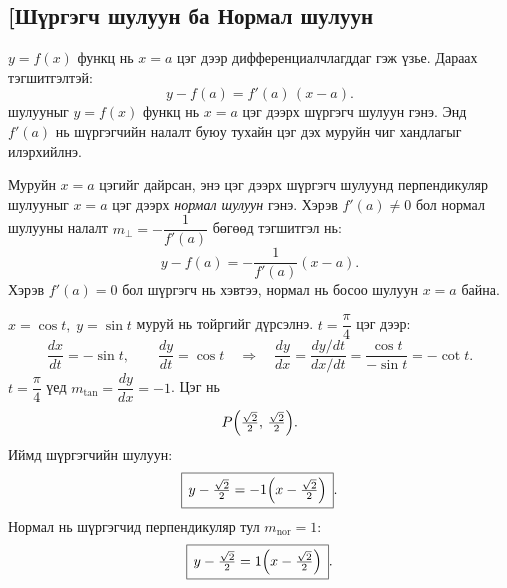 \subsection{[Шүргэгч шулуун ба Нормал шулуун}
\begin{definition}
$y=f(x)$ функц нь $x=a$ цэг дээр дифференциалчлагддаг гэж үзье.  
Дараах тэгшитгэлтэй:
\[
\boxed{y - f(a) = f'(a)\,(x - a).}
\] шулууныг $y=f(x)$ функц нь $x=a$ цэг дээрх шүргэгч шулуун гэнэ.
Энд $f'(a)$ нь шүргэгчийн налалт буюу тухайн цэг дэх муруйн чиг хандлагыг илэрхийлнэ.
\end{definition}
\begin{definition}
Муруйн $x=a$ цэгийг дайрсан, энэ цэг дээрх  шүргэгч шулуунд перпендикуляр шулууныг $x=a$ цэг дээрх \emph{нормал шулуун} гэнэ.  
Хэрэв $f'(a)\ne 0$ бол нормал шулууны налалт $m_\perp=-\dfrac{1}{f'(a)}$ бөгөөд тэгшитгэл нь:
\[
\boxed{y - f(a) = -\frac{1}{f'(a)}(x - a).}
\]
Хэрэв $f'(a)=0$ бол шүргэгч нь хэвтээ, нормал нь босоо шулуун $x=a$ байна.
\end{definition}

\begin{example}
 $x=\cos t,\; y=\sin t$ муруй нь тойргийг дүрсэлнэ. $t=\dfrac{\pi}{4}$ цэг дээр:
\[
\frac{dx}{dt}=-\sin t,\qquad \frac{dy}{dt}=\cos t
\quad\Rightarrow\quad
\frac{dy}{dx}=\frac{dy/dt}{dx/dt}=\frac{\cos t}{-\sin t}=-\cot t.
\]
$t=\dfrac{\pi}{4}$ үед \;$m_{\text{tan}}=\dfrac{dy}{dx}=-1$. Цэг нь
\[
P\Bigl(\tfrac{\sqrt2}{2},\,\tfrac{\sqrt2}{2}\Bigr).
\]
Иймд шүргэгчийн шулуун:
\[
\boxed{\,y-\tfrac{\sqrt2}{2}=-1\Bigl(x-\tfrac{\sqrt2}{2}\Bigr)\,}.
\]
Нормал нь шүргэгчид перпендикуляр тул \;$m_{\text{nor}}=1$:
\[
\boxed{\,y-\tfrac{\sqrt2}{2}=1\Bigl(x-\tfrac{\sqrt2}{2}\Bigr)\,}.
\]

\medskip
\begin{center}
\end{center}
\end{example}

